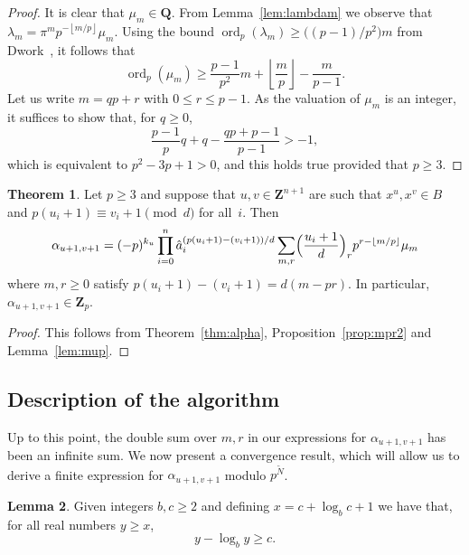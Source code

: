 \documentclass[a4paper,11pt]{article}
\numberwithin{equation}{section}
\providecommand{\floor}[1]{\left\lfloor#1\right\rfloor}   %
\newcommand{\ZZ}{\mathbf{Z}} %
\newcommand{\QQ}{\mathbf{Q}} %
\DeclareMathOperator{\ord}{ord}          %
\theoremstyle{definition}
\newtheorem{thm}{Theorem}[section]
\newtheorem{lem}[thm]{Lemma}
\begin{document}
\begin{proof}
It is clear that $\mu_m \in \QQ$.  From Lemma~\ref{lem:lambdam} 
we observe that $\lambda_m = \pi^m p^{- \floor{m/p}} \mu_m$.  Using the 
bound $\ord_p(\lambda_m) \geq \bigl((p-1)/p^2\bigr) m$ 
from Dwork~\citep[pp.~55--57]{Dwork1962}, it follows that 
\begin{equation}
\ord_p (\mu_m) \geq \frac{p-1}{p^2} m + \floor{\frac{m}{p}} - \frac{m}{p-1}.
\end{equation}
Let us write $m = q p + r$ with $0 \leq r \leq p-1$.  As the valuation 
of $\mu_m$ is an integer, it suffices to show that, for $q \geq 0$, 
\begin{equation}
\frac{p-1}{p} q + q - \frac{q p + p - 1}{p - 1} > -1,
\end{equation}
which is equivalent to $p^2 - 3p + 1 > 0$, and this holds true 
provided that $p \geq 3$.
\end{proof}

\begin{thm} \label{thm:alphap}
Let $p \geq 3$ and suppose that $u, v \in \ZZ^{n+1}$ are such 
that $x^u, x^v \in B$ and 
$p (u_i + 1) \equiv v_i + 1 \pmod{d}$ for all~$i$. Then 
\begin{equation} \label{eq:alphap.0}
\alpha_{u+1,v+1} = (-p)^{k_u} \prod_{i=0}^n 
    \hat{a}_i^{(p (u_i + 1) - (v_i + 1))/d} \sum_{m,r} 
    \Bigl(\frac{u_i+1}{d}\Bigr)_r p^{r - \floor{m/p}} \mu_m
\end{equation}
where $m, r \geq 0$ satisfy $p (u_i + 1) - (v_i + 1) = d (m - pr)$. 
In particular, $\alpha_{u+1, v+1} \in \ZZ_p$. 
\end{thm}

\begin{proof}
This follows from Theorem~\ref{thm:alpha}, Proposition~\ref{prop:mpr2} 
and Lemma~\ref{lem:mup}.
\end{proof}

\subsection{Description of the algorithm}

Up to this point, the double sum over $m,r$ in our expressions 
for $\alpha_{u+1,v+1}$ has been an infinite sum.  We now present 
a convergence result, which will allow us to derive a finite 
expression for $\alpha_{u+1,v+1}$ modulo $p^{\tilde{N}}$.

\begin{lem} \label{lem:log}
Given integers $b,c \geq 2$ and defining $x = c + \log_b c + 1$ 
we have that, for all real numbers $y \geq x$, 
\begin{equation}
y - \log_b y \geq c.
\end{equation}
\end{lem}
\end{document}
